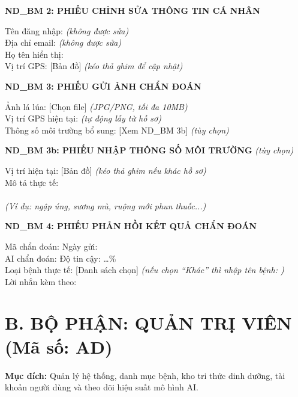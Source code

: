 \documentclass[12pt,a4paper]{article}
\begin{document}
\vspace{0.3cm}
\noindent\textbf{ND\_BM 2: PHIẾU CHỈNH SỬA THÔNG TIN CÁ NHÂN}

\noindent Tên đăng nhập: \dotfill \textit{(không được sửa)} \\
Địa chỉ email: \dotfill \textit{(không được sửa)} \\
Họ tên hiển thị: \dotfill \\
Vị trí GPS: [Bản đồ] \textit{(kéo thả ghim để cập nhật)}

\vspace{0.3cm}
\noindent\textbf{ND\_BM 3: PHIẾU GỬI ẢNH CHẨN ĐOÁN}

\noindent Ảnh lá lúa: [Chọn file] \textit{(JPG/PNG, tối đa 10MB)} \\
Vị trí GPS hiện tại: \dotfill \textit{(tự động lấy từ hồ sơ)} \\
Thông số môi trường bổ sung: [Xem ND\_BM 3b] \textit{(tùy chọn)}

\vspace{0.2cm}
\noindent\textbf{ND\_BM 3b: PHIẾU NHẬP THÔNG SỐ MÔI TRƯỜNG} \textit{(tùy chọn)}

\noindent Vị trí hiện tại: [Bản đồ] \textit{(kéo thả ghim nếu khác hồ sơ)} \\
Mô tả thực tế: \dotfill \\
\dotfill \\
\textit{(Ví dụ: ngập úng, sương mù, ruộng mới phun thuốc...)}

\vspace{0.3cm}
\noindent\textbf{ND\_BM 4: PHIẾU PHẢN HỒI KẾT QUẢ CHẨN ĐOÁN}

\noindent Mã chẩn đoán: \dotfill \quad Ngày gửi: \dotfill \\
AI chẩn đoán: \dotfill \quad Độ tin cậy: \dots\% \\
Loại bệnh thực tế: [Danh sách chọn] \textit{(nếu chọn ``Khác'' thì nhập tên bệnh: \dotfill)} \\
Lời nhắn kèm theo: \dotfill \\
\dotfill

\section*{B. BỘ PHẬN: QUẢN TRỊ VIÊN (Mã số: AD)}

\textbf{Mục đích:} Quản lý hệ thống, danh mục bệnh, kho tri thức dinh dưỡng, tài khoản người dùng và theo dõi hiệu suất mô hình AI.
\end{document}
